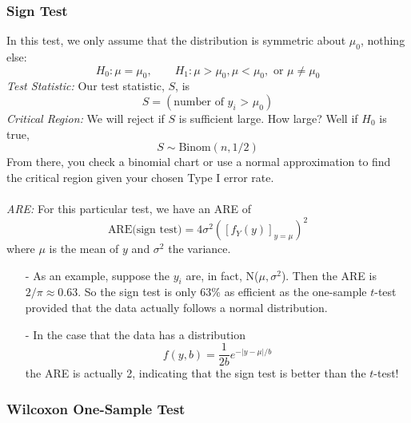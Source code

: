 \documentclass[a4paper,12pt]{scrartcl}
\begin{document}
\subsubsection{Sign Test}

In this test, we only assume that the distribution is 
symmetric about $\mu_0$, nothing else:
\[ H_0: \mu = \mu_0, \qquad H_1: \mu>\mu_0, \mu<\mu_0, \text{ or }
      \mu\neq\mu_0\]
{\sl Test Statistic:} Our test statistic, $S$, is
   \[ S = (\text{number of $y_i$ > $\mu_0$}) \]
{\sl Critical Region:} We will reject if $S$ is sufficient large. 
How large? Well if $H_0$ is true, 
   \[ S \sim \text{Binom}(n,1/2) \]
From there, you check a binomial chart or use a normal approximation
to find the critical region given your chosen Type I error rate.
\\
\\
{\sl ARE:} For this particular test, we have an ARE of
   \[ \text{ARE(sign test)} = 4\sigma^2 \left(\left[f_Y(y)\right]_{
      y=\mu} \right)^2 \]
where $\mu$ is the mean of $y$ and $\sigma^2$ the variance. 
\begin{itemize}
   \item[-] As an
      example, suppose the $y_i$ are, in fact, N($\mu, \sigma^2$). Then
      the ARE is $2/\pi\approx 0.63$.  So the sign test is only 63\%
      as efficient as the one-sample $t$-test provided that the data
      actually follows a normal distribution. 
   \item[-] In the case that the data has a distribution 
      \[ f(y,b) = \frac{1}{2b} e^{-|y-\mu|/b} \]
      the ARE is actually 2, indicating that the sign test is better
      than the $t$-test!
\end{itemize}


\newpage
\subsubsection{Wilcoxon One-Sample Test}
\end{document}
